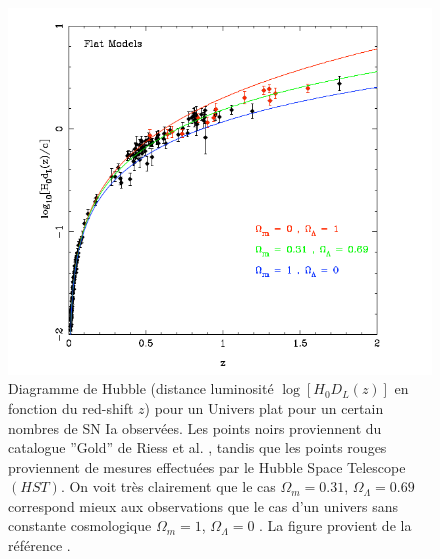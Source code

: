 \documentclass[a4paper,12pt]{report}
\theoremstyle{plain}
\theoremstyle{plain}
\begin{document}
\begin{figure}[h]
\includegraphics[width=30pc]{figgene1.png}
\caption{\label{figgene1} Diagramme de Hubble (distance luminosit\'e $ \log [H_0 D_L(z) ] $ en fonction du 
red-shift $z$) pour un Univers plat pour un certain nombres de SN Ia observ\'ees. Les points
noirs proviennent du catalogue ''Gold'' de Riess et al. \cite{225}, tandis que les points rouges
proviennent de mesures effectu\'ees par le Hubble Space Telescope $(HST)$. On voit tr\`es 
clairement que le cas $ \Omega_m = 0.31$, $ \Omega_\Lambda = 0.69$ correspond mieux aux observations que le cas d'un
univers sans constante cosmologique $ \Omega_m = 1$, $ \Omega_\Lambda = 0$ . La figure provient de la r\'ef\'erence
\cite{71}.}
\end{figure}
\end{document}
